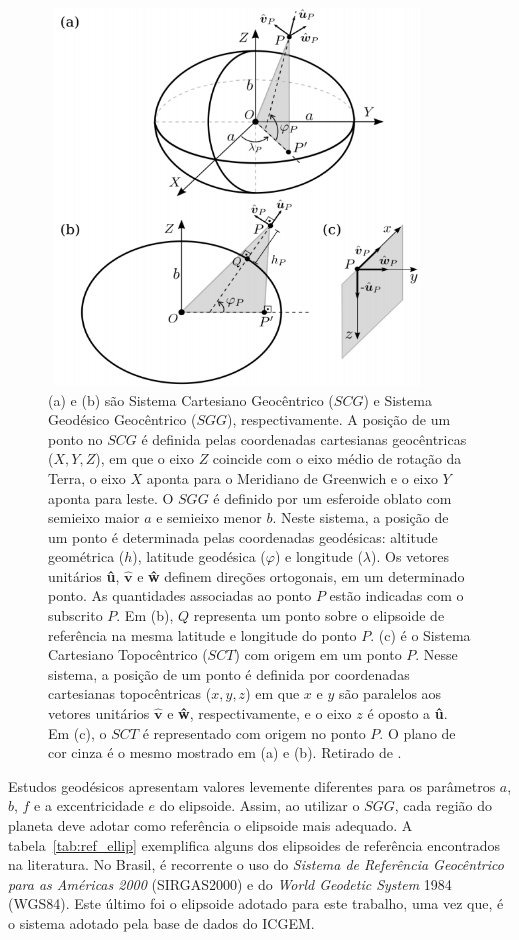 \begin{figure}[h]
	\centering
	\includegraphics[width=10cm,height=10cm]{figs/sistemas_de_referencia.png}
	\caption{ (a) e (b) são Sistema Cartesiano Geocêntrico ($SCG$) e Sistema Geodésico Geocêntrico ($SGG$), respectivamente. A posição de um ponto no $SCG$ é definida pelas coordenadas cartesianas geocêntricas ($X,Y,Z$), em que o eixo $Z$ coincide com o eixo médio de rotação da Terra, o eixo $X$ aponta para o Meridiano de Greenwich e o eixo $Y$ aponta para leste. O $SGG$ é definido por um esferoide oblato com semieixo maior $a$ e semieixo menor $b$. Neste sistema, a posição de um ponto é determinada pelas coordenadas geodésicas: altitude geométrica ($h$), latitude geodésica ($\varphi$) e longitude ($\lambda$). Os vetores unitários \textbf{û}, $\mathbf{\hat{v}}$ e \textbf{ŵ} definem direções ortogonais, em um determinado ponto. As quantidades associadas ao ponto $P$ estão indicadas com o subscrito $P$. Em (b), $Q$ representa um ponto sobre o elipsoide de referência na mesma latitude e longitude do ponto $P$. (c) é o Sistema Cartesiano Topocêntrico ($SCT$) com origem em um ponto $P$. Nesse sistema, a posição de um ponto é definida por coordenadas cartesianas topocêntricas ($x,y,z$) em que $x$ e $y$ são paralelos aos vetores unitários $\mathbf{\hat{v}}$ e \textbf{ŵ}, respectivamente, e o eixo $z$ é oposto a \textbf{û}. Em (c), o $SCT$ é representado com origem no ponto $P$. O plano de cor cinza é o mesmo mostrado em (a) e (b). Retirado de .}
	\label{fig:datum}
\end{figure}

Estudos geodésicos apresentam valores levemente diferentes para os parâmetros  $a$, $b$, $f$ e a excentricidade $e$ do elipsoide. Assim, ao utilizar o $SGG$, cada região do planeta deve adotar como referência o elipsoide mais adequado. A tabela~\ref{tab:ref_ellip} exemplifica alguns dos elipsoides de referência encontrados na literatura. No Brasil, é recorrente o uso do \textit{Sistema de Referência Geocêntrico para as Américas 2000} (SIRGAS2000) e do \textit{World Geodetic System} 1984 (WGS84). Este último foi o elipsoide adotado para este trabalho, uma vez que, é o sistema adotado pela base de dados do ICGEM.


